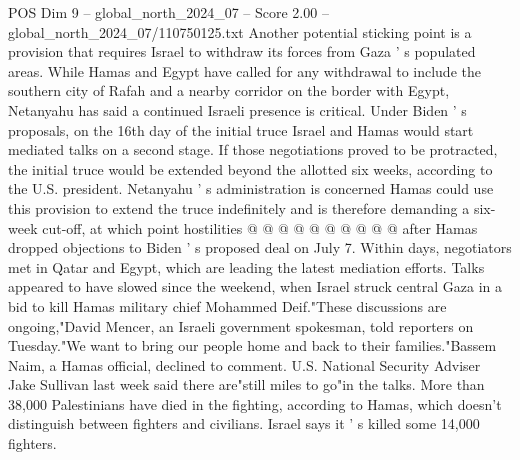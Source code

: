 \begin{textsample}{POS Dim 9 – global\_north\_2024\_07 – Score 2.00 – global\_north\_2024\_07/110750125.txt}
Another potential sticking point is a provision that requires Israel to withdraw its forces from Gaza ' s populated areas.
While Hamas and Egypt have called for any withdrawal to include the southern city of Rafah and a nearby corridor on the border with Egypt, Netanyahu has said a continued Israeli presence is critical.
Under Biden ' s proposals, on the 16th day of the initial truce Israel and Hamas would start mediated talks on a second stage.
If those negotiations proved to be protracted, the initial truce would be extended beyond the allotted six weeks, according to the U.S. president.
Netanyahu ' s administration is concerned Hamas could use this provision to extend the truce indefinitely and is therefore demanding a six-week cut-off, at which point hostilities @ @ @ @ @ @ @ @ @ @ after Hamas dropped objections to Biden ' s proposed deal on July 7.
Within days, negotiators met in Qatar and Egypt, which are leading the latest mediation efforts.
Talks appeared to have slowed since the weekend, when Israel struck central Gaza in a bid to kill Hamas military chief Mohammed Deif."These discussions are ongoing,"David Mencer, an Israeli government spokesman, told reporters on Tuesday."We want to bring our people home and back to their families."Bassem Naim, a Hamas official, declined to comment.
U.S.
National Security Adviser Jake Sullivan last week said there are"still miles to go"in the talks.
More than 38,000 Palestinians have died in the fighting, according to Hamas, which doesn't distinguish between fighters and civilians.
Israel says it ' s killed some 14,000 fighters.

\end{textsample}
